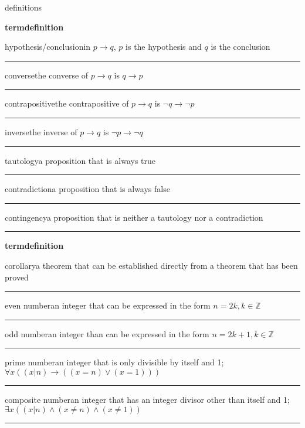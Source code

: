 \documentclass{article}
\newcommand{\twoPartStatement}[2]{
    \noindent\parbox{\linewidth}{
        #1\hfill#2
        \par
        \vspace{.5\baselineskip}
        \hrule
        \vspace{.5\baselineskip}
    }
}
\newcommand{\twoFields}[2]{
    \noindent
    \textbf{#1}\hfill\textbf{#2} \\
    \par
}
\newcommand{\sectionTitle}[1]{
    \begin{center}
        \large #1
    \end{center}
}
\begin{document}
\sectionTitle{definitions}
\begin{multicols}{2}
    \raggedcolumns
    \twoFields{term}{definition}
    \twoPartStatement
        {hypothesis/conclusion}
        {in $p\rightarrow q$, $p$ is the hypothesis and $q$ is the conclusion}
    \twoPartStatement
        {converse}
        {the converse of $p\rightarrow q$ is $q\rightarrow p$}
    \twoPartStatement
        {contrapositive}
        {the contrapositive of $p\rightarrow q$ is $\neg q\rightarrow\neg p$}
    \twoPartStatement
        {inverse}
        {the inverse of $p\rightarrow q$ is $\neg p\rightarrow\neg q$}
    \twoPartStatement
        {tautology}
        {a proposition that is always true}
    \twoPartStatement
        {contradiction}
        {a proposition that is always false}
    \twoPartStatement
        {contingency}
        {a proposition that is neither a tautology nor a contradiction}
    \twoFields{term}{definition}
    \twoPartStatement
        {corollary}
        {a theorem that can be established directly from a theorem that has been proved}
    \twoPartStatement
        {even number}
        {an integer that can be expressed in the form $n=2k,k\in\mathbb{Z}$}
    \twoPartStatement
        {odd number}
        {an integer than can be expressed in the form $n=2k+1,k\in\mathbb{Z}$}
    \twoPartStatement
        {prime number}
        {an integer that is only divisible by itself and 1; $\forall x((x|n)\rightarrow ((x=n)\lor(x=1)))$}
    \twoPartStatement
        {composite number}
        {an integer that has an integer divisor other than itself and 1; $\exists x((x|n)\land(x\neq n)\land(x\neq 1))$}
\end{multicols}
\end{document}

